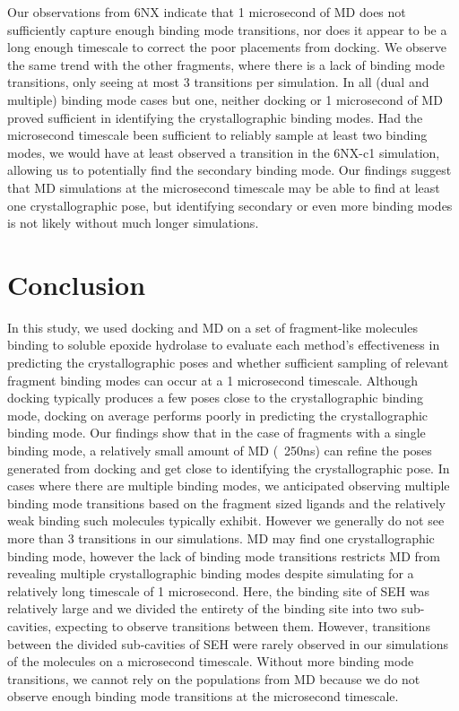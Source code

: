Our observations from 6NX indicate that 1 microsecond of MD does not sufficiently capture enough binding mode transitions, nor does it appear to be a long enough timescale to correct the poor placements from docking.
We observe the same trend with the other fragments, where there is a lack of binding mode transitions, only seeing at most 3 transitions per simulation.
In all (dual and multiple) binding mode cases but one, neither docking or 1 microsecond of MD proved sufficient in identifying the crystallographic binding modes.
Had the microsecond timescale been sufficient to reliably sample at least two binding modes, we would have at least observed a transition in the 6NX-c1 simulation, allowing us to potentially find the secondary binding mode.
Our findings suggest that MD simulations at the microsecond timescale may be able to find at least one crystallographic pose, but identifying secondary or even more binding modes is not likely without much longer simulations. 

\section{Conclusion}
In this study, we used docking and MD on a set of fragment-like molecules binding to soluble epoxide hydrolase to evaluate each method's effectiveness in predicting the crystallographic poses and whether sufficient sampling of relevant fragment binding modes can occur at a 1 microsecond timescale.
Although docking typically produces a few poses close to the crystallographic binding mode, docking on average performs poorly in predicting the crystallographic binding mode.
Our findings show that in the case of fragments with a single binding mode, a relatively small amount of MD  (~250ns) can refine the poses generated from docking and get close to identifying the crystallographic pose. 
In cases where there are multiple binding modes, we anticipated observing multiple binding mode transitions based on the fragment sized ligands and the relatively weak binding such molecules typically exhibit. However we generally do not see more than 3 transitions in our simulations.
MD may find one crystallographic binding mode, however the lack of binding mode transitions restricts MD from revealing multiple crystallographic binding modes despite simulating for a relatively long timescale of 1 microsecond.
Here, the binding site of SEH was relatively large and we divided the entirety of the binding site into two sub-cavities, expecting to observe transitions between them.
However, transitions between the divided sub-cavities of SEH were rarely observed in our simulations of the molecules on a microsecond timescale.
Without more binding mode transitions, we cannot rely on the populations from MD because we do not observe enough binding mode transitions at the microsecond timescale. 

